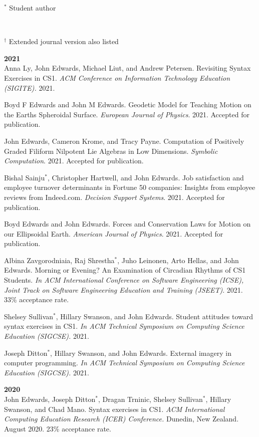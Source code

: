 \documentclass[margin,line]{res}
\begin{document}
\begin{resume}
\begin{footnotesize}$^*$ Student author\end{footnotesize}
\\\begin{footnotesize}$^\dagger$ Extended journal version also listed\end{footnotesize}

\textbf{2021} \\
Anna Ly, John Edwards, Michael Liut, and Andrew Petersen. Revisiting Syntax Exercises in CS1. \textit{ACM Conference on Information Technology Education (SIGITE).} 2021.

Boyd F Edwards and John M Edwards. Geodetic Model for Teaching Motion on the Earths Spheroidal Surface. \textit{European Journal of Physics}. 2021. Accepted for publication.

John Edwards, Cameron Krome, and Tracy Payne. Computation of Positively Graded Filiform Nilpotent Lie Algebras in Low Dimensions. \textit{Symbolic Computation}. 2021. Accepted for publication.

Bishal Sainju$^*$, Christopher Hartwell, and John Edwards. Job satisfaction and employee turnover determinants in Fortune 50 companies: Insights from employee reviews from Indeed.com. \textit{Decision Support Systems}. 2021. Accepted for publication.

Boyd Edwards and John Edwards. Forces and Conservation Laws for Motion on our Ellipsoidal Earth. \textit{American Journal of Physics}. 2021. Accepted for publication.

Albina Zavgorodniaia, Raj Shrestha$^*$, Juho Leinonen, Arto Hellas, and John Edwards. Morning or Evening? An Examination of Circadian Rhythms of CS1 Students. \textit{In ACM International Conference on Software Engineering (ICSE), Joint Track on Software Engineering Education and Training (JSEET)}. 2021. 33\% acceptance rate.

Shelsey Sullivan$^*$, Hillary Swanson, and John Edwards. Student attitudes toward syntax exercises in CS1. \textit{In ACM Technical Symposium on Computing Science Education (SIGCSE).} 2021.

Joseph Ditton$^*$, Hillary Swanson, and John Edwards. External imagery in computer programming. \textit{In ACM Technical Symposium on Computing Science Education (SIGCSE).} 2021.

\textbf{2020} \\
John Edwards, Joseph Ditton$^*$, Dragan Trninic, Shelsey Sullivan$^*$, Hillary Swanson, and Chad Mano. Syntax exercises in CS1. \textit{ACM International Computing Education Research (ICER) Conference.} Dunedin, New Zealand. August 2020. 23\% acceptance rate.


\end{resume}
\end{document}
